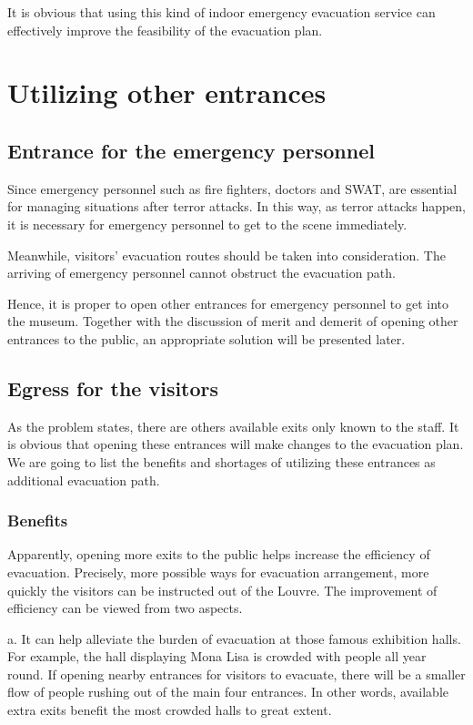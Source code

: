 \documentclass{mcmthesis}
\begin{document}
It is obvious that using this kind of indoor emergency evacuation service can effectively improve the feasibility of the evacuation plan.

\section{ Utilizing other entrances}

\subsection{Entrance for the emergency personnel}
Since emergency personnel such as fire fighters, doctors and SWAT, are essential for managing situations after terror attacks. In this way, as terror attacks happen, it is necessary for emergency personnel to get to the scene immediately. 

Meanwhile, visitors' evacuation routes should be taken into consideration. The arriving of emergency personnel cannot obstruct the evacuation path. 

Hence, it is proper to open other entrances for emergency personnel to get into the museum. Together with the discussion of merit and demerit of opening other entrances to the public, an appropriate solution will be presented later.

\subsection{Egress for the visitors}

As the problem states, there are others available exits only known to the staff. It is obvious that opening these entrances will make changes to the evacuation plan. We are going to list the benefits and shortages of utilizing these entrances as additional evacuation path.

\subsubsection{Benefits}

Apparently, opening more exits to the public helps increase the efficiency of evacuation. Precisely, more possible ways for evacuation arrangement, more quickly the visitors can be instructed out of the Louvre.  The improvement of efficiency can be viewed from two aspects.

a. It can help alleviate the burden of evacuation at those famous exhibition halls. For example, the hall displaying Mona Lisa is crowded with people all year round. If opening nearby entrances for visitors to evacuate, there will be a smaller flow of people rushing out of the main four entrances. In other words, available extra exits benefit the most crowded halls to great extent.
\end{document}
